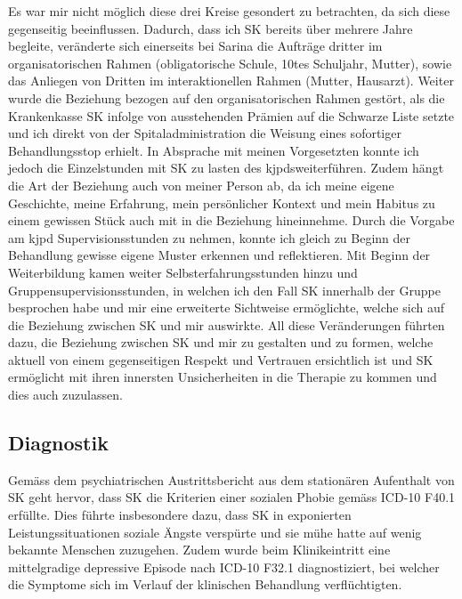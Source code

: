 Es war mir nicht möglich diese drei Kreise gesondert zu betrachten, da sich diese  gegenseitig beeinflussen. Dadurch, dass ich SK bereits über mehrere Jahre begleite, veränderte sich einerseits bei Sarina die Aufträge dritter im organisatorischen Rahmen (obligatorische Schule, 10tes Schuljahr, Mutter), sowie das Anliegen von Dritten im interaktionellen Rahmen (Mutter, Hausarzt). Weiter wurde die Beziehung bezogen auf den organisatorischen Rahmen gestört, als die Krankenkasse SK infolge von ausstehenden Prämien auf die Schwarze Liste setzte und ich direkt von der Spitaladministration die Weisung eines sofortiger Behandlungsstop erhielt. In Absprache mit meinen Vorgesetzten konnte ich jedoch die Einzelstunden mit SK zu lasten des \acp{kjpd}weiterführen. Zudem hängt die Art der Beziehung auch von meiner Person ab, da ich meine eigene Geschichte, meine Erfahrung, mein persönlicher Kontext und mein Habitus zu einem gewissen Stück auch mit in die Beziehung hineinnehme. Durch die Vorgabe am \ac{kjpd} Supervisionsstunden zu nehmen, konnte ich gleich zu Beginn der Behandlung gewisse eigene Muster erkennen und reflektieren. Mit Beginn der Weiterbildung kamen weiter Selbsterfahrungsstunden hinzu und Gruppensupervisionsstunden, in welchen ich den Fall SK innerhalb der Gruppe besprochen habe und mir eine erweiterte Sichtweise ermöglichte, welche sich auf die Beziehung zwischen SK und mir auswirkte. All diese Veränderungen führten dazu, die Beziehung zwischen SK und mir zu gestalten und zu formen, welche aktuell von einem gegenseitigen Respekt und Vertrauen ersichtlich ist und SK ermöglicht mit ihren innersten Unsicherheiten in die Therapie zu kommen und dies auch zuzulassen. 

 
\subsection{Diagnostik} 
Gemäss dem psychiatrischen Austrittsbericht aus dem stationären Aufenthalt von SK geht hervor, dass SK die Kriterien einer sozialen Phobie gemäss ICD-10 F40.1 erfüllte. Dies führte insbesondere dazu, dass SK in exponierten Leistungssituationen soziale Ängste verspürte und sie mühe hatte auf wenig bekannte Menschen zuzugehen. Zudem wurde beim Klinikeintritt eine mittelgradige depressive Episode nach ICD-10 F32.1 diagnostiziert, bei welcher die Symptome sich im Verlauf der klinischen Behandlung verflüchtigten. 

